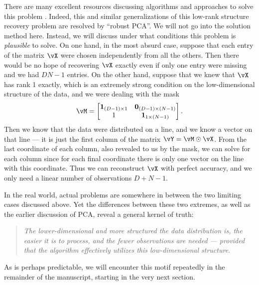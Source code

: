 \documentclass[../../book-main.tex]{subfiles}
\begin{document}
There are many excellent resources discussing algorithms and approaches to solve this problem \cite{Wright-Ma-2022}. Indeed, this and similar generalizations of this low-rank structure recovery problem are resolved by ``robust PCA''. We will not go into the solution method here. Instead, we will discuss under what conditions this problem is \textit{plausible} to solve. On one hand, in the most absurd case, suppose that each entry of the matrix \(\vX\) were chosen independently from all the others. Then there would be no hope of recovering \(\vX\) exactly even if only one entry were missing and we had \(DN - 1\) entries. On the other hand, suppose that we knew that \(\vX\) has rank 1 exactly, which is an extremely strong condition on the low-dimensional structure of the data, and we were dealing with the mask
\begin{equation}
    \vM = \mat{\vone_{(D - 1) \times 1} & \vzero_{(D - 1) \times (N - 1)} \\ 1 & \vone_{1 \times (N - 1)} }.
\end{equation}
Then we know that the data were distributed on a line, and we know a vector on that line --- it is just the first column of the matrix \(\vY = \vM \odot \vX\). From the last coordinate of each column, also revealed to us by the mask, we can solve for each column since for each final coordinate there is only one vector on the line with this coordinate. Thus we can reconstruct \(\vX\) with perfect accuracy, and we only need a linear number of observations \(D + N - 1\). 

In the real world, actual problems are somewhere in between the two limiting cases discussed above. Yet the differences between these two extremes, as well as the earlier discussion of PCA, reveal a general kernel of truth:
\begin{quote}
    \centering
    \textit{The lower-dimensional and more structured the data distribution is, the easier it is to process, and the fewer observations are needed --- provided that the algorithm effectively utilizes this low-dimensional structure.}
\end{quote}
As is perhaps predictable, we will encounter this motif repeatedly in the remainder of the manuscript, starting in the very next section.
\end{document}
